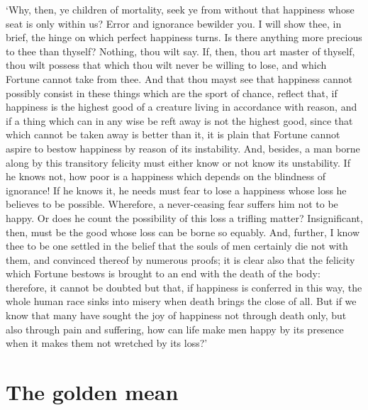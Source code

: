 \documentclass[12pt]{book}
\begin{document}
`Why, then, ye children of mortality, seek ye from without that
happiness whose seat is only within us? Error and ignorance bewilder
you. I will show thee, in brief, the hinge on which perfect happiness
turns. Is there anything more precious to thee than thyself? Nothing,
thou wilt say. If, then, thou art master of thyself, thou wilt possess
that which thou wilt never be willing to lose, and which Fortune cannot
take from thee. And that thou mayst see that happiness cannot possibly
consist in these things which are the sport of chance, reflect that, if
happiness is the highest good of a creature living in accordance with
reason, and if a thing which can in any wise be reft away is not the
highest good, since that which cannot be taken away is better than it,
it is plain that Fortune cannot aspire to bestow happiness by reason of
its instability. And, besides, a man borne along by this transitory
felicity must either know or not know its unstability. If he knows not,
how poor is a happiness which depends on the blindness of ignorance! If
he knows it, he needs must fear to lose a happiness whose loss he
believes to be possible. Wherefore, a never-ceasing fear suffers him not
to be happy. Or does he count the possibility of this loss a trifling
matter? Insignificant, then, must be the good whose loss can be borne so
equably. And, further, I know thee to be one settled in the belief that
the souls of men certainly die not with them, and convinced thereof by
numerous proofs; it is clear also that the felicity which Fortune
bestows is brought to an end with the death of the body: therefore, it
cannot be doubted but that, if happiness is conferred in this way, the
whole human race sinks into misery when death brings the close of all.
But if we know that many have sought the joy of happiness not through
death only, but also through pain and suffering, how can life make men
happy by its presence when it makes them not wretched by its loss?'




\section{The golden mean}
\end{document}
